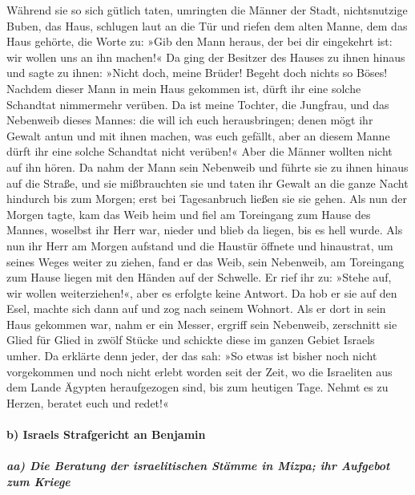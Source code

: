 Während sie so sich gütlich taten, umringten die Männer
der Stadt, nichtsnutzige Buben, das Haus, schlugen laut an die Tür und
riefen dem alten Manne, dem das Haus gehörte, die Worte zu: »Gib den
Mann heraus, der bei dir eingekehrt ist: wir wollen uns an ihn machen!«
Da ging der Besitzer des Hauses zu ihnen hinaus und sagte
zu ihnen: »Nicht doch, meine Brüder! Begeht doch nichts so Böses!
Nachdem dieser Mann in mein Haus gekommen ist, dürft ihr eine solche
Schandtat nimmermehr verüben. Da ist meine Tochter, die
Jungfrau, und das Nebenweib dieses Mannes: die will ich euch
herausbringen; denen mögt ihr Gewalt antun und mit ihnen machen, was
euch gefällt, aber an diesem Manne dürft ihr eine solche Schandtat nicht
verüben!« Aber die Männer wollten nicht auf ihn hören. Da
nahm der Mann sein Nebenweib und führte sie zu ihnen hinaus auf die
Straße, und sie mißbrauchten sie und taten ihr Gewalt an die ganze Nacht
hindurch bis zum Morgen; erst bei Tagesanbruch ließen sie sie gehen.
Als nun der Morgen tagte, kam das Weib heim und fiel am
Toreingang zum Hause des Mannes, woselbst ihr Herr war, nieder und blieb
da liegen, bis es hell wurde. Als nun ihr Herr am Morgen
aufstand und die Haustür öffnete und hinaustrat, um seines Weges weiter
zu ziehen, fand er das Weib, sein Nebenweib, am Toreingang zum Hause
liegen mit den Händen auf der Schwelle. Er rief ihr zu:
»Stehe auf, wir wollen weiterziehen!«, aber es erfolgte keine Antwort.
Da hob er sie auf den Esel, machte sich dann auf und zog nach seinem
Wohnort. Als er dort in sein Haus gekommen war, nahm er
ein Messer, ergriff sein Nebenweib, zerschnitt sie Glied für Glied in
zwölf Stücke und schickte diese im ganzen Gebiet Israels umher.
Da erklärte denn jeder, der das sah: »So etwas ist bisher
noch nicht vorgekommen und noch nicht erlebt worden seit der Zeit, wo
die Israeliten aus dem Lande Ägypten heraufgezogen sind, bis zum
heutigen Tage. Nehmt es zu Herzen, beratet euch und redet!«

\hypertarget{b-israels-strafgericht-an-benjamin}{%
\paragraph{b) Israels Strafgericht an
Benjamin}\label{b-israels-strafgericht-an-benjamin}}

\hypertarget{aa-die-beratung-der-israelitischen-stuxe4mme-in-mizpa-ihr-aufgebot-zum-kriege}{%
\subparagraph{aa) Die Beratung der israelitischen Stämme in Mizpa; ihr
Aufgebot zum
Kriege}\label{aa-die-beratung-der-israelitischen-stuxe4mme-in-mizpa-ihr-aufgebot-zum-kriege}}

